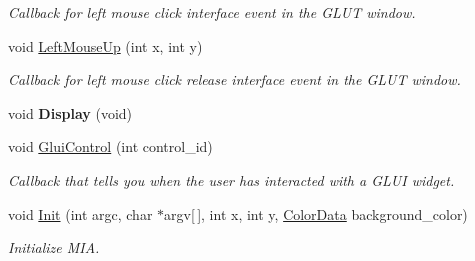 \begin{DoxyCompactItemize}
\begin{DoxyCompactList}\small\item\em Callback for left mouse click interface event in the G\+L\+UT window. \end{DoxyCompactList}\item 
void \hyperlink{classimage__tools_1_1MIAApp_a2717842596d33af77f20644527a8b556}{Left\+Mouse\+Up} (int x, int y)\hypertarget{classimage__tools_1_1MIAApp_a2717842596d33af77f20644527a8b556}{}\label{classimage__tools_1_1MIAApp_a2717842596d33af77f20644527a8b556}

\begin{DoxyCompactList}\small\item\em Callback for left mouse click release interface event in the G\+L\+UT window. \end{DoxyCompactList}\item 
void {\bfseries Display} (void)\hypertarget{classimage__tools_1_1MIAApp_add76b61a146970333b216e027aabc3bc}{}\label{classimage__tools_1_1MIAApp_add76b61a146970333b216e027aabc3bc}

\item 
void \hyperlink{classimage__tools_1_1MIAApp_a4e10cc8b814e12c16c38d4e2be3bf2bb}{Glui\+Control} (int control\+\_\+id)\hypertarget{classimage__tools_1_1MIAApp_a4e10cc8b814e12c16c38d4e2be3bf2bb}{}\label{classimage__tools_1_1MIAApp_a4e10cc8b814e12c16c38d4e2be3bf2bb}

\begin{DoxyCompactList}\small\item\em Callback that tells you when the user has interacted with a G\+L\+UI widget. \end{DoxyCompactList}\item 
void \hyperlink{classimage__tools_1_1MIAApp_ab5bd2eb36e76c8bb81bef6c56f6bf55d}{Init} (int argc, char $\ast$argv\mbox{[}$\,$\mbox{]}, int x, int y, \hyperlink{classimage__tools_1_1ColorData}{Color\+Data} background\+\_\+color)
\begin{DoxyCompactList}\small\item\em Initialize M\+IA. \end{DoxyCompactList}\end{DoxyCompactItemize}
